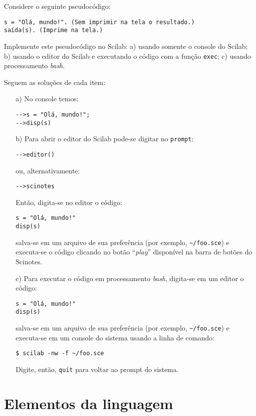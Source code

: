 \begin{ex}
  Considere o seguinte pseudocódigo:
\begin{verbatim}
s = "Olá, mundo!". (Sem imprimir na tela o resultado.)
saída(s). (Imprime na tela.)
\end{verbatim}
Implemente este pseudocódigo no Scilab: a) usando somente o console do Scilab; b) usando o editor do Scilab e executando o código com a função \verb+exec+; c) usando processamento {\it bash}.
\end{ex}
\begin{sol} Seguem as soluções de cada item:
  \begin{itemize}
  \item[a)]  No console temos:
\begin{verbatim}
-->s = "Olá, mundo!";
-->disp(s)
\end{verbatim}
  \item[b)] Para abrir o editor do Scilab pode-se digitar no \verb+prompt+:
\begin{verbatim}
-->editor()
\end{verbatim}
ou, alternativamente:
\begin{verbatim}
-->scinotes
\end{verbatim}
Então, digita-se no editor o código:
\begin{verbatim}
s = "Olá, mundo!"
disp(s)
\end{verbatim}
salva-se em um arquivo de sua preferência (por exemplo, \verb+~/foo.sce+) e executa-se o código clicando no botão ``{\it play}'' disponível na barra de botões do Scinotes.
\item[c)] Para executar o código em processamento {\it bash}, digita-se em um editor o código:
\begin{verbatim}
s = "Olá, mundo!"
disp(s)
\end{verbatim}
salva-se em um arquivo de sua preferência (por exemplo, \verb+~/foo.sce+) e executa-se em um console do sistema usando a linha de comando:
\begin{verbatim}
$ scilab -nw -f ~/foo.sce
\end{verbatim}
Digite, então, \verb+quit+ para voltar ao prompt do sistema.
\end{itemize}
\end{sol}

\section{Elementos da linguagem}

